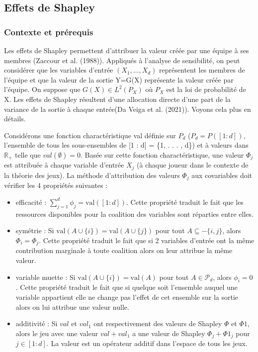 \documentclass[
]{article}
\begin{document}
\hypertarget{effets-de-shapley}{%
\subsection{Effets de Shapley}\label{effets-de-shapley}}

\hypertarget{contexte-et-pruxe9requis}{%
\subsubsection{Contexte et prérequis}\label{contexte-et-pruxe9requis}}

Les effets de Shapley permettent d'attribuer la valeur créée par une
équipe à ses membres (Zaccour et al. (1988)). Appliqués à l'analyse de
sensibilité, on peut considérer que les variables d'entrée
\((X_1, ..., X_d)\) représentent les membres de l'équipe et que la
valeur de la sortie Y=G(X) représente la valeur créée par l'équipe. On
suppose que \(G(X) \in L^2(P_X)\) où \(P_X\) est la loi de probabilité
de X. Les effets de Shapley résultent d'une allocation directe d'une
part de la variance de la sortie à chaque entrée(Da Veiga et al.
(2021)). Voyons cela plus en détails.

Considérons une fonction charactéristique val définie sur \(P_d\)
(\(P_d = P([1 : d])\), l'ensemble de tous les sous-ensembles de {[}1 :
d{]} = \{1, . . . , d\}) et à valeurs dans \(\mathbb{R}_+\) telle que
\(val(\emptyset)=0\). Basée sur cette fonction charactéristique, une
valeur \(\Phi_j\) est attribuée à chaque variable d'entrée \(X_j\) (à
chaque joueur dans le contexte de la théorie des jeux). La méthode
d'attribution des valeurs \(\Phi_j\) aux covariables doit vérifier les 4
propriétés suivantes :

\begin{itemize}
\item
  efficacité : \(\sum_{j=1}^{d} \phi_j = \text{val}([1 : d])\). Cette
  propriété traduit le fait que les ressources disponibles pour la
  coalition des variables sont réparties entre elles.
\item
  symétrie : Si \(\text{val}(A \cup \{i\}) = \text{val}(A \cup \{j\})\)
  pour tout \(A \subseteq -\{i, j\}\), alors \(\Phi_i = \Phi_j\). Cette
  propriété traduit le fait que si 2 variables d'entrée ont la même
  contribution marginale à toute coalition alors on leur attribue la
  même valeur.
\item
  variable muette : Si \(\text{val}(A \cup \{i\}) = \text{val}(A)\) pour
  tout \(A \in \mathcal{P}_d\), alors \(\phi_i = 0\). Cette propriété
  traduit le fait que si quelque soit l'ensemble auquel une variable
  appartient elle ne change pas l'effet de cet ensemble sur la sortie
  alors on lui attribue une valeur nulle.
\item
  additivité : Si \(val\) et \(val_1\) ont respectivement des valeurs de
  Shapley \(\Phi\) et \(\Phi1\), alors le jeu avec une valeur
  \(val + val_1\) a une valeur de Shapley \(\Phi_j + \Phi1_{j}\) pour
  \(j \in [1 : d]\). La valeur est un opérateur additif dans l'espace de
  tous les jeux.
\end{itemize}
\end{document}
